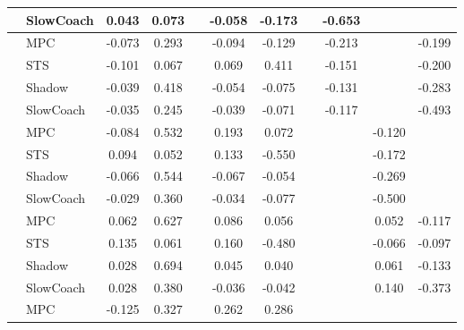 \begin{tabular}{|l|l|*{9}{c|}}
                                                           & SlowCoach &    0.043 &     0.073 &        & -0.058 & -0.173 &     &  -0.653 &      &       \\
\midrule
[True, True, False, True, True, False, True, False, True] & MPC &   -0.073 &     0.293 &        & -0.094 & -0.129 &     &  -0.213 &      &   -0.199 \\
                                                           & STS &   -0.101 &     0.067 &        &  0.069 &  0.411 &     &  -0.151 &      &   -0.200 \\
                                                           & Shadow &   -0.039 &     0.418 &        & -0.054 & -0.075 &     &  -0.131 &      &   -0.283 \\
                                                           & SlowCoach &   -0.035 &     0.245 &        & -0.039 & -0.071 &     &  -0.117 &      &   -0.493 \\
\midrule
[True, True, False, True, True, False, False, True, False] & MPC &   -0.084 &     0.532 &        &  0.193 &  0.072 &     &      &  -0.120 &       \\
                                                           & STS &    0.094 &     0.052 &        &  0.133 & -0.550 &     &      &  -0.172 &       \\
                                                           & Shadow &   -0.066 &     0.544 &        & -0.067 & -0.054 &     &      &  -0.269 &       \\
                                                           & SlowCoach &   -0.029 &     0.360 &        & -0.034 & -0.077 &     &      &  -0.500 &       \\
\midrule
[True, True, False, True, True, False, False, True, True] & MPC &    0.062 &     0.627 &        &  0.086 &  0.056 &     &      &   0.052 &   -0.117 \\
                                                           & STS &    0.135 &     0.061 &        &  0.160 & -0.480 &     &      &  -0.066 &   -0.097 \\
                                                           & Shadow &    0.028 &     0.694 &        &  0.045 &  0.040 &     &      &   0.061 &   -0.133 \\
                                                           & SlowCoach &    0.028 &     0.380 &        & -0.036 & -0.042 &     &      &   0.140 &   -0.373 \\
\midrule
[True, True, False, True, True, False, False, False, False] & MPC &   -0.125 &     0.327 &        &  0.262 &  0.286 &     &      &      &       \\

\end{tabular}
